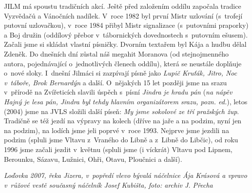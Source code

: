 \documentclass[a5paper, 12pt, twoside]{article}
\begin{document}
JILM má spoustu tradičních akcí. Ještě před založením oddílu započala
tradice Vyzvědačů a Vánočních nadílek. V~roce 1982 byl první Mistr
uzlování (s~trofejí putovní uzlovačkou), v~roce 1984 přibyl Mistr
signalizace (s~putovními praporky) a Boj družin (oddílový přebor
v~tábornických dovednostech s~putovním ešusem). Začali jsme si skládat
vlastní písničky. Dvorním textařem byl Kája a hudbu dělal Zdeněk. Do
dnešních dní zůstal náš megahit Moranova (od stejnojmenného autora,
pojednávající o~jednotlivých členech oddílu), která se neustále doplňuje
o~nové sloky. I~dnešní Jilmáci si zazpívají písně jako \textit{Lupič
Kruťák, Jitro, Noc v~táboře, Brok Bernardýn} a další. O~nějakých 15 let
později jsme na srazu v~přírodě na Zvířeticích slavili úspěch s~písní
\textit{Jindra je hradu pán} (\textit{na nápěv Hajný je lesa pán, Jindra byl
tehdy hlavním organizátorem srazu, pozn. ed.}), letos (2004) jsme na
JVLS složili další píseň: \textit{My jsme sokolové ze tří pražských žup}.
Tradičně se též jezdí na výpravy na kolech (dříve na jaře a na podzim,
nyní jen na podzim), na lodích jsme jeli poprvé v~roce 1993. Nejprve
jsme jezdili na podzim (spluli jsme Vltavu z~Vraného do Libně a z~Libně
do Libčic), od roku 1996 jsme začali jezdit v~květnu (spluli jsme (i
víckrát) Vltavu pod Lipnem, Berounku, Sázavu, Lužnici, Ohři, Otavu,
Ploučnici a další).


\textit{Loďovka 2007, řeka Jizera, v~popředí vlevo bývalá náčelnice Ája
Krásová a vpravo v~růžové vestě současný náčelník Josef Kubišta, foto:
archiv J. Přecha}
\end{document}
